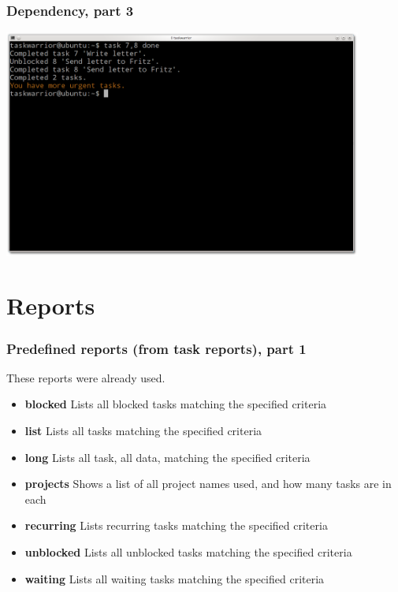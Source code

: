 \documentclass[t,handout]{beamer}
\begin{document}
\begin{frame}[fragile]\frametitle{Dependency, part 3}
\begin{center} %
\includegraphics[width=11.8cm,height=7.5cm]{dependency3.png}
\end{center}
\end{frame}

\section{Reports}

\begin{frame}\frametitle{Predefined reports (from task reports), part 1}

These reports were already used.

\begin{itemize}
\item \textbf{blocked}          Lists all blocked tasks matching the specified criteria
\item \textbf{list}             Lists all tasks matching the specified criteria
\item \textbf{long}             Lists all task, all data, matching the specified criteria
\item \textbf{projects}         Shows a list of all project names used, and how many tasks are in each
\item \textbf{recurring}        Lists recurring tasks matching the specified criteria
\item \textbf{unblocked}        Lists all unblocked tasks matching the specified criteria
\item \textbf{waiting}          Lists all waiting tasks matching the specified criteria
\end{itemize}
\end{frame}
\end{document}
